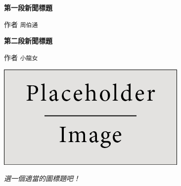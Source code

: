 \documentclass[10pt,a4paper]{article}
\newcommand{\NewsItem}[1]{ %
\vspace{24pt}\bf \large #1\vspace{3pt} %
\par \normalsize \normalfont}
\newcommand{\NewsAuthor}[1]{ %
\hfill 作者 \texttt{#1} \vspace{20pt} %
\par \normalfont}
\begin{document}
\begin{multicols}{3} %


\NewsItem{第一段新聞標題}
\NewsAuthor{周伯通}

\zhlipsum[4][name=trad]

\zhlipsum[14][name=trad]


\NewsItem{第二段新聞標題}
\NewsAuthor{小龍女}

\zhlipsum[6][name=trad]

\zhlipsum[7][name=trad]

\end{multicols} %

\begin{center}
\vspace{10pt}
\includegraphics[width=0.8\linewidth]{placeholder.jpg} %
\par\large\textit{選一個適當的圖標題吧！}
\vspace{10pt}
\end{center}
\end{document}
